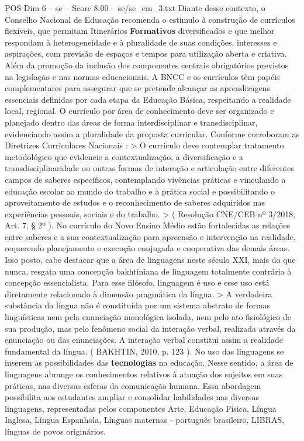 \begin{textsample}{POS Dim 6 – se – Score 8.00 – se/se\_em\_3.txt}
Diante desse contexto, o Conselho Nacional de Educação recomenda o estímulo à construção de currículos flexíveis, que permitam Itinerários \textbf{Formativos} diversificados e que melhor respondam à heterogeneidade e à pluralidade de suas condições, interesses e aspirações, com previsão de espaços e tempos para utilização aberta e criativa.
Além da promoção da inclusão dos componentes centrais obrigatórios previstos na legislação e nas normas educacionais.
A BNCC e os currículos têm papéis complementares para assegurar que se pretende alcançar as aprendizagens essenciais definidas por cada etapa da Educação Básica, respeitando a realidade local, regional.
O currículo por área de conhecimento deve ser organizado e planejado dentro das áreas de forma interdisciplinar e transdisciplinar, evidenciando assim a pluralidade da proposta curricular.
Conforme corroboram as Diretrizes Curriculares Nacionais : > O currículo deve contemplar tratamento metodológico que evidencie a contextualização, a diversificação e a transdisciplinaridade ou outras formas de interação e articulação entre diferentes campos de saberes específicos, contemplando vivências práticas e vinculando a educação escolar ao mundo do trabalho e à prática social e possibilitando o aproveitamento de estudos e o reconhecimento de saberes adquiridos nas experiências pessoais, sociais e do trabalho. > ( Resolução CNE/CEB nº 3/2018, Art. 7, § 2º ).
No currículo do Novo Ensino Médio estão fortalecidas as relações entre saberes e a sua contextualização para apreensão e intervenção na realidade, requerendo planejamento e execução conjugada e cooperativa das demais áreas.
Isso posto, cabe destacar que a área de linguagens neste século XXI, mais do que nunca, resgata uma concepção bakhtiniana de linguagem totalmente contrária à concepção essencialista.
Para esse filósofo, linguagem é uso e esse uso está diretamente relacionado à dimensão pragmática da língua. > A verdadeira substância da língua não é constituída por um sistema abstrato de formas linguísticas nem pela enunciação monológica isolada, nem pelo ato fisiológico de sua produção, mas pelo fenômeno social da interação verbal, realizada através da enunciação ou das enunciações.
A interação verbal constitui assim a realidade fundamental da língua. ( BAKHTIN, 2010, p. 123 ).
No uso das linguagens se inserem as possibilidades das \textbf{tecnologias} na educação.
Nesse sentido, a área de linguagens abrange os conhecimentos relativos à atuação dos sujeitos em suas práticas, nas diversas esferas da comunicação humana.
Essa abordagem possibilita aos estudantes ampliar e consolidar habilidades nas diversas linguagens, representadas pelos componentes Arte, Educação Física, Língua Inglesa, Língua Espanhola, Línguas maternas - português brasileiro, LIBRAS, línguas de povos originários.

\end{textsample}

